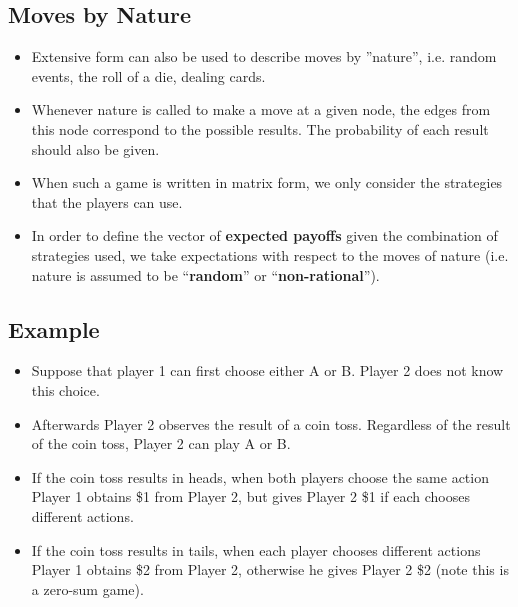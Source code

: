 \documentclass[]{report}
\begin{document}
\subsection{Moves by Nature}
\begin{itemize}
	\item Extensive form can also be used to describe moves by ”nature”,
	i.e. random events, the roll of a die, dealing cards.
\item Whenever nature is called to make a move at a given node, the
	edges from this node correspond to the possible results. The
	probability of each result should also be given.
\item When such a game is written in matrix form, we only consider the
	strategies that the players can use. 
\item In order to define the vector of
	\textbf{expected payoffs} given the combination of strategies used, we
	take expectations with respect to the moves of nature (i.e. nature
	is assumed to be ``\textbf{random}” or ``\textbf{non-rational}”).
\end{itemize}



\subsection{Example}
\begin{itemize}
	\item Suppose that player 1 can first choose either A or B. Player 2 does
	not know this choice.
\item Afterwards Player 2 observes the result of a coin toss. Regardless
	of the result of the coin toss, Player 2 can play A or B.
\item If the coin toss results in heads, when both players choose the
	same action Player 1 obtains \$1 from Player 2, but gives Player 2
	\$1 if each chooses different actions. 
\item If the coin toss results in tails,
	when each player chooses different actions Player 1 obtains \$2
	from Player 2, otherwise he gives Player 2 \$2 (note this is a
	zero-sum game).
\end{itemize}
\end{document}
